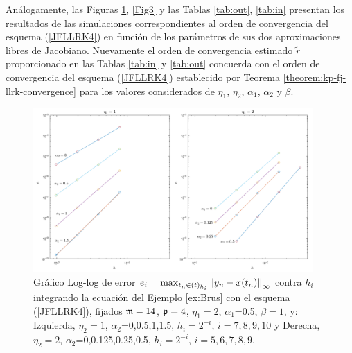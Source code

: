 Análogamente, las Figuras \ref{Fig2}, \ref{Fig3} y las Tablas \ref{tab:out}, \ref{tab:in} presentan los resultados de las simulaciones correspondientes al orden de convergencia del esquema (\ref{JFLLRK4}) en función de los parámetros de sus dos aproximaciones libres de Jacobiano. Nuevamente el orden de convergencia estimado $\widetilde{r}$ proporcionado en las Tablas \ref{tab:in} y \ref{tab:out} concuerda con el orden de convergencia del esquema (\ref{JFLLRK4}) establecido por Teorema \ref{theorem:kp-fj-llrk-convergence} para los valores considerados de $\eta_1$, $\eta_2$, $\alpha_1$, $\alpha_2$ y $\beta$.


\begin{figure}[htb]
	\centering
	\includegraphics[width=0.95\textwidth]{Graphics/lldp-fj/out_new.png}
	\caption{Gráfico Log-log de error $e_i=\max_{t_n\in(t)_{h_i}}\left\lVert y_n-x(t_n) \right\rVert_\infty$ contra $h_i$ integrando la ecuación del Ejemplo \ref{ex:Brus} con el esquema (\ref{JFLLRK4}), fijados $\mathfrak{m}=14$, $\mathfrak{p}=4$, $\eta_1=2$, $\alpha_1$=0.5, $\beta=1$, y: Izquierda, $\eta_2=1$, $\alpha_2$=0,0.5,1,1.5, $h_i=2^{-i}$, $i=7,8,9,10$ y Derecha, $\eta_2=2$, $\alpha_2$=0,0.125,0.25,0.5, $h_i=2^{-i}$, $i=5,6,7,8,9$.}
	\label{Fig2}
\end{figure}

